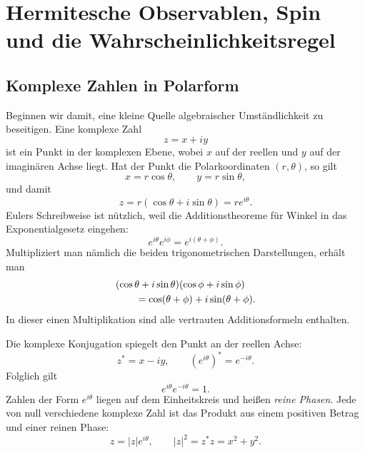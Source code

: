 \chapter{Hermitesche Observablen, Spin und die Wahrscheinlichkeitsregel}


\section{Komplexe Zahlen in Polarform}

Beginnen wir damit, eine kleine Quelle algebraischer Umständlichkeit zu beseitigen. Eine komplexe Zahl
\begin{equation}
  z=x+iy
\end{equation}
ist ein Punkt in der komplexen Ebene, wobei \(x\) auf der reellen und \(y\) auf der imaginären Achse liegt. Hat der Punkt die Polarkoordinaten \((r,\theta)\), so gilt
\begin{equation}
  x=r\cos\theta,
  \qquad
  y=r\sin\theta,
\end{equation}
und damit
\begin{equation}
  z=r(\cos\theta+i\sin\theta)=re^{i\theta}.
  \label{eq:l03-polar-form}
\end{equation}
Eulers Schreibweise ist nützlich, weil die Additionstheoreme für Winkel in das Exponentialgesetz eingehen:
\begin{equation}
  e^{i\theta}e^{i\phi}
  =e^{i(\theta+\phi)}.
  \label{eq:l03-phase-product}
\end{equation}
Multipliziert man nämlich die beiden trigonometrischen Darstellungen, erhält man
\begin{align}
& (\cos\theta+i\sin\theta)(\cos\phi+i\sin\phi)
\notag\\
&\qquad=\cos(\theta+\phi)+i\sin(\theta+\phi).
\end{align}
In dieser einen Multiplikation sind alle vertrauten Additionsformeln enthalten.

Die komplexe Konjugation spiegelt den Punkt an der reellen Achse:
\begin{equation}
  z^*=x-iy,
  \qquad
  (e^{i\theta})^*=e^{-i\theta}.
\end{equation}
Folglich gilt
\begin{equation}
  e^{i\theta}e^{-i\theta}=1.
\end{equation}
Zahlen der Form \(e^{i\theta}\) liegen auf dem Einheitskreis und heißen \emph{reine Phasen}. Jede von null verschiedene komplexe Zahl ist das Produkt aus einem positiven Betrag und einer reinen Phase:
\begin{equation}
  z=|z|e^{i\theta},
  \qquad
  |z|^2=z^*z=x^2+y^2.
  \label{eq:l03-modulus-phase}
\end{equation}

